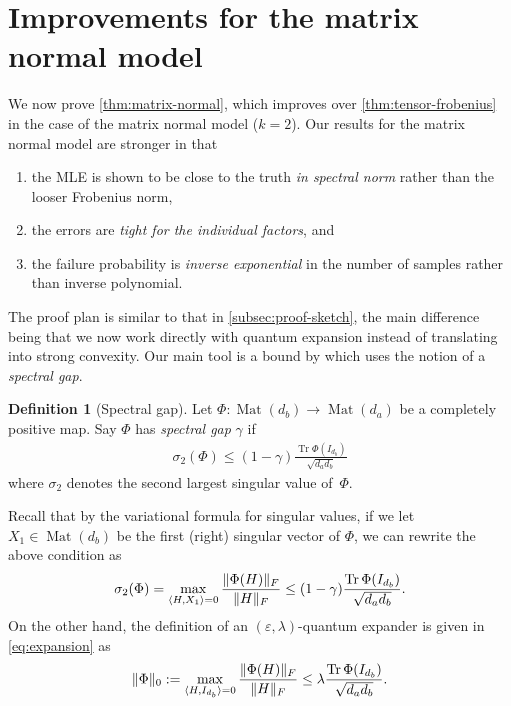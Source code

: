 \documentclass[aos]{imsart}
\theoremstyle{definition}
\newtheorem{definition}[theorem]{Definition}
\numberwithin{equation}{section}
\DeclareMathOperator{\Mat}{Mat}
\DeclareMathOperator{\tr}{Tr}
\DeclarePairedDelimiter{\norm}{\lVert}{\rVert}
\newcommand{\eps}{\varepsilon}
\begin{document}
\section{Improvements for the matrix normal model}\label{sec:matrix-normal}
We now prove \cref{thm:matrix-normal}, which improves over \cref{thm:tensor-frobenius} in the case of the matrix normal model ($k=2$).
Our results for the matrix normal model are stronger in that
\begin{enumerate}
\item the MLE is shown to be close to the truth \emph{in spectral norm} rather than the looser Frobenius norm,
\item the errors are \emph{tight for the individual factors}, and
\item the failure probability is \emph{inverse exponential} in the number of samples rather than inverse polynomial.
\end{enumerate}

The proof plan is similar to that in \cref{subsec:proof-sketch}, the main difference being that we now work directly with quantum expansion instead of translating into strong convexity.
Our main tool is a bound by \cite{KLR19} which uses the notion of a \emph{spectral gap}.

\begin{definition}[Spectral gap]
Let $\Phi\colon\Mat(d_b) \to \Mat(d_a)$ be a completely positive map.
Say $\Phi$ has \emph{spectral gap} $\gamma$ if
\begin{align}\label{eq:spectral-gap}
  \sigma_2(\Phi) \leq (1 - \gamma) \frac{\tr \Phi(I_{d_b})}{\sqrt{d_a d_b}}
\end{align}
where $\sigma_2$ denotes the second largest singular value of~$\Phi$.
\end{definition}

Recall that by the variational formula for singular values, if we let $X_{1} \in \Mat(d_{b})$ be the first (right) singular vector of $\Phi$, we can rewrite the above condition as
\begin{align*}
  \sigma_2(\Phi) = \max_{\langle H, X_{1} \rangle = 0} \frac{\norm{\Phi(H)}_{F}}{\norm{H}_{F}} \leq (1 - \gamma) \frac{\tr \Phi(I_{d_b})}{\sqrt{d_a d_b}} .
\end{align*}
On the other hand, the definition of an $(\eps,\lambda)$-quantum expander is given in \cref{eq:expansion} as
\begin{align*}
      \norm{\Phi}_0 := \max_{\langle H, I_{d_{b}} \rangle = 0} \frac{\norm{\Phi(H)}_F}{\norm{H}_{F}}
\leq \lambda \frac{\tr \Phi(I_{d_b})}{\sqrt{d_a d_b}}  .
\end{align*}
\end{document}

